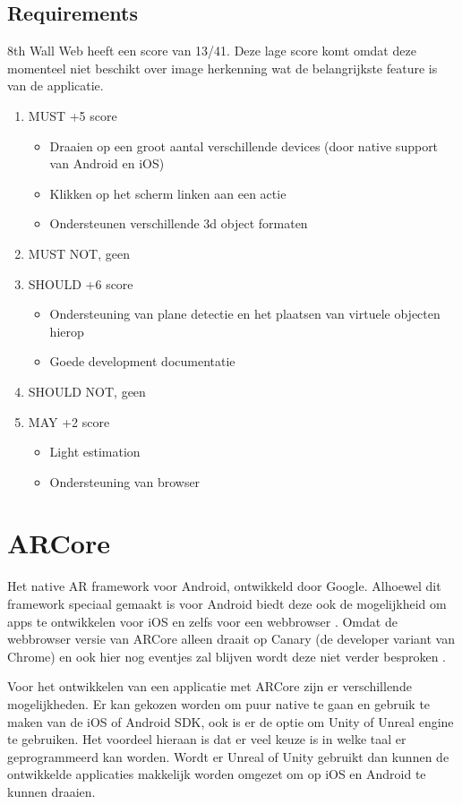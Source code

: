 \subsection{Requirements}
8th Wall Web heeft een score van 13/41. Deze lage score komt omdat deze momenteel niet beschikt over image herkenning wat de belangrijkste feature is van de applicatie.
\begin{enumerate}
    \item MUST +5 score
    \begin{itemize}
        \item Draaien op een groot aantal verschillende devices (door native support van Android en iOS)
        \item Klikken op het scherm linken aan een actie 
        \item Ondersteunen verschillende 3d object formaten
    \end{itemize}
    \item MUST NOT, geen
    \item SHOULD +6 score
    \begin{itemize}
        \item Ondersteuning van plane detectie en het plaatsen van virtuele objecten hierop
        \item Goede development documentatie
    \end{itemize}
    \item SHOULD NOT, geen
    \item MAY +2 score
    \begin{itemize}
        \item Light estimation
        \item Ondersteuning van browser
    \end{itemize}
\end{enumerate}

\section{ARCore}
Het native AR framework voor Android, ontwikkeld door Google. Alhoewel dit framework speciaal gemaakt is voor Android biedt deze ook de mogelijkheid om apps te ontwikkelen voor iOS en zelfs voor een webbrowser \autocite{ARCoreOverview}. Omdat de webbrowser versie van ARCore alleen draait op Canary (de developer variant van Chrome) en ook hier nog eventjes zal blijven wordt deze niet verder besproken \autocite{ARCoreWeb}.

Voor het ontwikkelen van een applicatie met ARCore zijn er verschillende mogelijkheden. Er kan gekozen worden om puur native te gaan en gebruik te maken van de iOS of Android SDK, ook is er de optie om Unity of Unreal engine te gebruiken. Het voordeel hieraan is dat er veel keuze is in welke taal er geprogrammeerd kan worden. Wordt er Unreal of Unity gebruikt dan kunnen de ontwikkelde applicaties makkelijk worden omgezet om op iOS en Android te kunnen draaien. 

